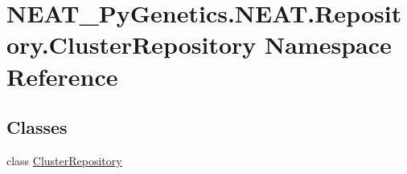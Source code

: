 \hypertarget{namespaceNEAT__PyGenetics_1_1NEAT_1_1Repository_1_1ClusterRepository}{}\section{N\+E\+A\+T\+\_\+\+Py\+Genetics.\+N\+E\+A\+T.\+Repository.\+Cluster\+Repository Namespace Reference}
\label{namespaceNEAT__PyGenetics_1_1NEAT_1_1Repository_1_1ClusterRepository}
\subsection*{Classes}
\begin{DoxyCompactItemize}
\item 
class \hyperlink{classNEAT__PyGenetics_1_1NEAT_1_1Repository_1_1ClusterRepository_1_1ClusterRepository}{Cluster\+Repository}
\end{DoxyCompactItemize}
